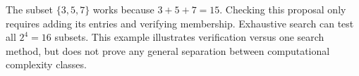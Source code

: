 The subset $\boxed{\{3,5,7\}}$ works because $3+5+7=15$. Checking this proposal only requires adding its entries and verifying membership. Exhaustive search can test all $2^4=16$ subsets. This example illustrates verification versus one search method, but does not prove any general separation between computational complexity classes.
